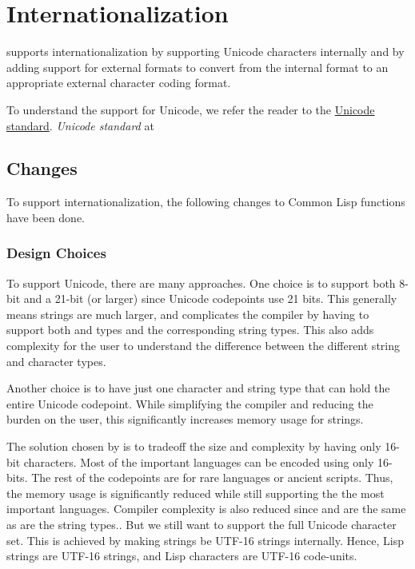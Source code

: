 \chapter{Internationalization}
\label{i18n}

\cmucl{} supports internationalization by supporting Unicode
characters internally and by adding support for external formats to
convert from the internal format to an appropriate external character
coding format.

To understand the support for Unicode, we refer the reader to the
\ifpdf
\href{http://www.unicode.org/}{Unicode standard}.
\else
\emph{Unicode standard} at \href{http://www.unicode.org}
\fi
\section{Changes}

To support internationalization, the following changes to Common Lisp
functions have been done.


\subsection{Design Choices}

To support Unicode, there are many approaches.  One choice is to
support both 8-bit  and a 21-bit (or larger)
 since Unicode codepoints use 21 bits.  This generally
means strings are much larger, and complicates the compiler by having
to support both  and  types and the
corresponding string types.  This also adds complexity for the user to
understand the difference between the different string and character
types.

Another choice is to have just one character and string type that can
hold the entire Unicode codepoint.  While simplifying the compiler and
reducing the burden on the user, this significantly increases memory
usage for strings.

The solution chosen by \cmucl{} is to tradeoff the size and complexity
by having only 16-bit characters.  Most of the important languages can
be encoded using only 16-bits.  The rest of the codepoints are for
rare languages or ancient scripts.  Thus, the memory usage is
significantly reduced while still supporting the the most important
languages.  Compiler complexity is also reduced since 
and  are the same as are the string types..  But we
still want to support the full Unicode character set.  This is
achieved by making strings be UTF-16 strings internally.  Hence, Lisp
strings are UTF-16 strings, and Lisp characters are UTF-16 code-units.



